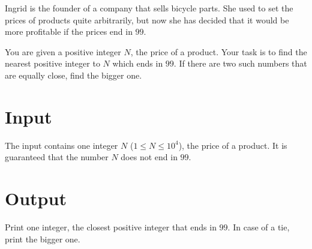 

Ingrid is the founder of a company that sells bicycle parts. She used to set 
the prices of products quite arbitrarily, but now she has decided that it would 
be more profitable if the prices end in $99$.

You are given a positive integer $N$, the price of a product. Your task is to find
the nearest positive integer to $N$ which ends in $99$. If there are two such numbers
that are equally close, find the bigger one.

\section*{Input}
The input contains one integer $N$ ($1 \leq N \leq 10^4$), the price of a product. 
It is guaranteed that the number $N$ does not end in $99$.

\section*{Output}
Print one integer, the closest positive integer that ends in $99$. In case of a tie, 
print the bigger one.
